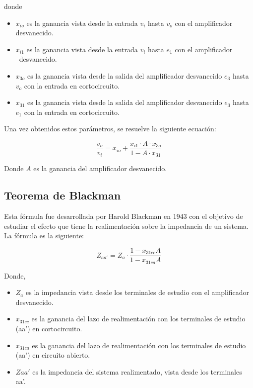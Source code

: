 donde

\begin{itemize}
    \item $x_{io}$ es la ganancia vista desde la entrada $v_i$ hasta $v_o$ con el amplificador
desvanecido.
    \item $x_{i1}$ es la ganancia vista desde la entrada $v_i$ hasta $e_1$ con el amplificador \
desvanecido.
    \item $x_{3o}$ es la ganancia vista desde la salida del amplificador desvanecido $e_3$
hasta $v_o$ con la entrada en cortocircuito.
    \item $x_{31}$ es la ganancia vista desde la salida del amplificador desvanecido $e_3$
hasta $e_1$ con la entrada en cortocircuito.
\end{itemize}

Una vez obtenidos estos parámetros, se resuelve la siguiente ecuación:

\begin{equation}
    \frac{v_o}{v_i} = x_{io} + \frac{x_{i1} \cdot A \cdot x_{3o}}{1 - A \cdot x_{31}}
\end{equation}

Donde $A$ es la ganancia del amplificador desvanecido.

\subsection{Teorema de Blackman}

Esta fórmula fue desarrollada por Harold Blackman en 1943 con el objetivo de estudiar el efecto que tiene la realimentación sobre la impedancia de
un sistema. La fórmula es la siguiente:

\begin{equation}
Z_{aa'} = Z_a \cdot \frac{1 - x_{31cc}A}{1 - x_{31ca}A}
\end{equation}

Donde,

\begin{itemize}
    \item $Z_a$ es la impedancia vista desde los terminales de estudio con el amplificador desvanecido.
    \item $x_{31cc}$ es la ganancia del lazo de realimentación con los terminales de estudio (aa') en cortocircuito.
    \item $x_{31ca}$ es la ganancia del lazo de realimentación con los terminales de
estudio (aa') en circuito abierto.
\item $Z{aa'}$ es la impedancia del sistema realimentado, vista desde los terminales aa'.
\end{itemize}

